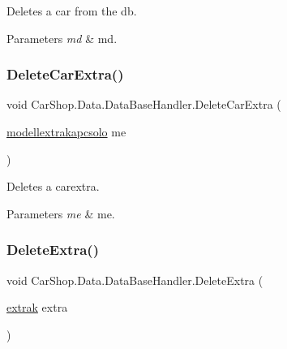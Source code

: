 Deletes a car from the db. 


\begin{DoxyParams}{Parameters}
{\em md} & md.\\
\hline
\end{DoxyParams}
\mbox{\label{class_car_shop_1_1_data_1_1_data_base_handler_aaa26584fccb994deb54909269824f550}} 
\subsubsection{\texorpdfstring{Delete\+Car\+Extra()}{DeleteCarExtra()}}
{\footnotesize\ttfamily void Car\+Shop.\+Data.\+Data\+Base\+Handler.\+Delete\+Car\+Extra (\begin{DoxyParamCaption}\item[{\mbox{\hyperlink{class_car_shop_1_1_data_1_1modellextrakapcsolo}{modellextrakapcsolo}}}]{me }\end{DoxyParamCaption})}



Deletes a carextra. 


\begin{DoxyParams}{Parameters}
{\em me} & me.\\
\hline
\end{DoxyParams}
\mbox{\label{class_car_shop_1_1_data_1_1_data_base_handler_afcd19abfce52c381a2020e404d4350d4}} 
\subsubsection{\texorpdfstring{Delete\+Extra()}{DeleteExtra()}}
{\footnotesize\ttfamily void Car\+Shop.\+Data.\+Data\+Base\+Handler.\+Delete\+Extra (\begin{DoxyParamCaption}\item[{\mbox{\hyperlink{class_car_shop_1_1_data_1_1extrak}{extrak}}}]{extra }\end{DoxyParamCaption})}



